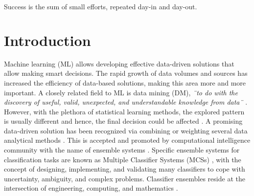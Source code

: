 



\begin{savequote}[50mm]
Success is the sum of small efforts, repeated day-in and day-out.
\end{savequote}

\chapter{Introduction}
\label{cha:1_Introduction}

\ifpdf
    \graphicspath{{1_introduction/figures/PNG/}{1_introduction/figures/PDF/}{1_introduction/figures/}}
\else
    \graphicspath{{1_introduction/figures/EPS/}{1_introduction/figures/}}
\fi



Machine learning (ML) allows developing effective data-driven solutions that allow making smart decisions. The rapid growth of data volumes and sources has increased the efficiency of data-based solutions, making this area more and more important. A closely related field to ML is data mining (DM), \textit{¨to do with the discovery of useful, valid, unexpected, and understandable knowledge from data¨} \cite{torgo2016}. However, with the plethora of statistical learning methods, the explored pattern is usually different and hence, the final decision could be affected \cite{hand2014}. A promising data-driven solution has been recognized via combining or weighting several data analytical methods \cite{breiman1996,breiman2001,freund1997}. This is accepted and promoted by computational intelligence community with the name of ensemble systems \cite{polikar2012,dietterich2002,opitz1999,sagi2018,oza2001,krawczyk2017,zhang2012}. Specific ensemble systems for classification tasks are known as Multiple Classifier Systems (MCSs) \cite{polikar2006,rokach2010,kuncheva2014,wozniak2014}, with the concept of designing, implementing, and validating many classifiers to cope with uncertainty, ambiguity, and complex problems.  Classifier ensembles reside at the intersection of engineering, computing, and mathematics \cite{kuncheva2014}. 

